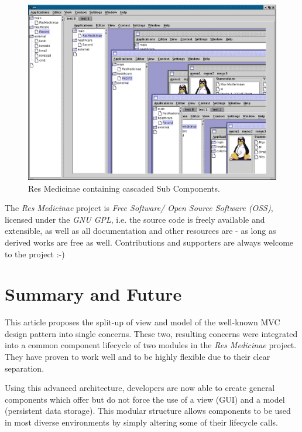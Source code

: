 \documentclass[a4paper,10pt]{llncs}
\begin{document}
\begin{figure}[ht]
\begin{center}
\includegraphics[scale=0.2]{resmedicinae_containing_cascaded_subcomponents}
\caption{Res Medicinae containing cascaded Sub Components.}
\label{fig:resmedicinae_containing_cascaded_subcomponents}
\end{center}
\end{figure}

The \emph{Res Medicinae} project is \emph{Free Software/ Open Source Software (OSS)},
licensed under the \emph{GNU GPL}, i.e. the source code is freely available and extensible,
as well as all documentation and other resources are - as long as derived works are free as well.
Contributions and supporters are always welcome to the project :-)

%
%
\section{Summary and Future}

This article proposes the split-up of view and model of the well-known MVC design pattern
into single concerns. These two, resulting concerns were integrated into a common component lifecycle
of two modules in the \emph{Res Medicinae} project. They have proven to work well and to be highly
flexible due to their clear separation.

Using this advanced architecture, developers are now able to create general components
which offer but do not force the use of a view (GUI) and a model (persistent data storage).
This modular structure allows components to be used in most diverse environments
by simply altering some of their lifecycle calls.
\end{document}
